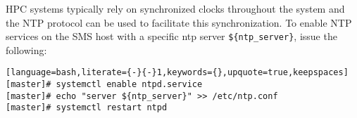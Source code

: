 HPC systems typically rely on synchronized clocks throughout the system and the
NTP protocol can be used to facilitate this synchronization.  To enable NTP
services on the SMS host with a specific ntp server \texttt{\$\{ntp\_server\}},
issue the following:

\begin{lstlisting}[language=bash,literate={-}{-}1,keywords={},upquote=true,keepspaces]
[master]# systemctl enable ntpd.service
[master]# echo "server ${ntp_server}" >> /etc/ntp.conf
[master]# systemctl restart ntpd
\end{lstlisting}
